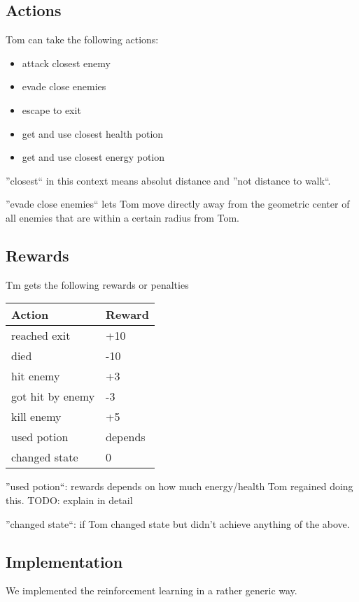 \documentclass[a4paper,10pt]{scrartcl}
\begin{document}
\subsection{Actions}
Tom can take the following actions:
\begin{itemize}
 \item attack closest enemy
 \item evade close enemies
 \item escape to exit
 \item get and use closest health potion
 \item get and use closest energy potion
\end{itemize}

''closest`` in this context means absolut distance and ''not distance to walk``. \par

''evade close enemies`` lets Tom move directly away from the geometric center of all enemies that are within a certain radius from Tom.

\subsection{Rewards}
Tm gets the following rewards or penalties
\begin{center}
\begin{tabular}{l|l}
Action & Reward \\
\hline
reached exit & +10 \\
died & -10 \\
hit enemy & +3 \\
got hit by enemy & -3 \\
kill enemy & +5 \\
used potion & depends \\
changed state & 0
\end{tabular}
\end{center}

''used potion``: rewards depends on how much energy/health Tom regained doing this. TODO: explain in detail \par
''changed state``: if Tom changed state but didn't achieve anything of the above.

\subsection{Implementation}
We implemented the reinforcement learning in a rather generic way. \par
\end{document}
